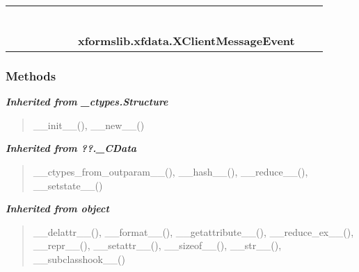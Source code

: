     \label{xformslib:xfdata:XClientMessageEvent}
\begin{tabular}{cccccccccc}
\multicolumn{2}{r}{\settowidth{\BCL}{object}\multirow{2}{\BCL}{object}}
&&
&&
&&
  \\\cline{3-3}
  &&\multicolumn{1}{c|}{}
&&
&&
&&
  \\
\multicolumn{4}{r}{\settowidth{\BCL}{??.\_CData}\multirow{2}{\BCL}{??.\_CData}}
&&
&&
  \\\cline{5-5}
  &&&&\multicolumn{1}{c|}{}
&&
&&
  \\
\multicolumn{6}{r}{\settowidth{\BCL}{\_ctypes.Structure}\multirow{2}{\BCL}{\_ctypes.Structure}}
&&
  \\\cline{7-7}
  &&&&&&\multicolumn{1}{c|}{}
&&
  \\
&&&&&&\multicolumn{2}{l}{\textbf{xformslib.xfdata.XClientMessageEvent}}
\end{tabular}



  \subsubsection{Methods}


\large{\textbf{\textit{Inherited from \_ctypes.Structure}}}

\begin{quote}
\_\_init\_\_(), \_\_new\_\_()
\end{quote}

\large{\textbf{\textit{Inherited from ??.\_CData}}}

\begin{quote}
\_\_ctypes\_from\_outparam\_\_(), \_\_hash\_\_(), \_\_reduce\_\_(), \_\_setstate\_\_()
\end{quote}

\large{\textbf{\textit{Inherited from object}}}

\begin{quote}
\_\_delattr\_\_(), \_\_format\_\_(), \_\_getattribute\_\_(), \_\_reduce\_ex\_\_(), \_\_repr\_\_(), \_\_setattr\_\_(), \_\_sizeof\_\_(), \_\_str\_\_(), \_\_subclasshook\_\_()
\end{quote}

